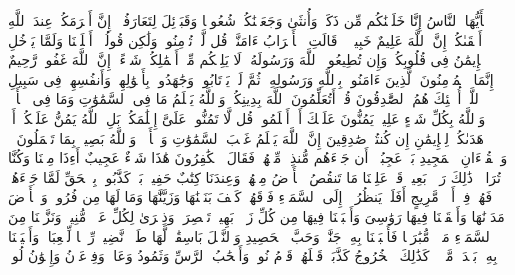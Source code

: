 \stopbuffer%
\startbuffer[\q:49:13]
یَٰۤأَیُّهَا ٱلنَّاسُ إِنَّا خَلَقۡنَٰكُم مِّن ذَكَرࣲ وَأُنثَىٰ وَجَعَلۡنَٰكُمۡ شُعُوبࣰا وَقَبَاۤئِلَ لِتَعَارَفُوۤا۟ۚ إِنَّ أَكۡرَمَكُمۡ عِندَ ٱللَّهِ أَتۡقَىٰكُمۡۚ إِنَّ ٱللَّهَ عَلِیمٌ خَبِیرࣱ%
\stopbuffer%
\startbuffer[\q:49:14]
۞ قَالَتِ ٱلۡأَعۡرَابُ ءَامَنَّاۖ قُل لَّمۡ تُؤۡمِنُوا۟ وَلَٰكِن قُولُوۤا۟ أَسۡلَمۡنَا وَلَمَّا یَدۡخُلِ ٱلۡإِیمَٰنُ فِی قُلُوبِكُمۡۖ وَإِن تُطِیعُوا۟ ٱللَّهَ وَرَسُولَهُۥ لَا یَلِتۡكُم مِّنۡ أَعۡمَٰلِكُمۡ شَیۡءًاۚ إِنَّ ٱللَّهَ غَفُورࣱ رَّحِیمٌ%
\stopbuffer%
\startbuffer[\q:49:15]
إِنَّمَا ٱلۡمُؤۡمِنُونَ ٱلَّذِینَ ءَامَنُوا۟ بِٱللَّهِ وَرَسُولِهِۦ ثُمَّ لَمۡ یَرۡتَابُوا۟ وَجَٰهَدُوا۟ بِأَمۡوَٰلِهِمۡ وَأَنفُسِهِمۡ فِی سَبِیلِ ٱللَّهِۚ أُو۟لَٰۤئِكَ هُمُ ٱلصَّٰدِقُونَ%
\stopbuffer%
\startbuffer[\q:49:16]
قُلۡ أَتُعَلِّمُونَ ٱللَّهَ بِدِینِكُمۡ وَٱللَّهُ یَعۡلَمُ مَا فِی ٱلسَّمَٰوَٰتِ وَمَا فِی ٱلۡأَرۡضِۚ وَٱللَّهُ بِكُلِّ شَیۡءٍ عَلِیمࣱ%
\stopbuffer%
\startbuffer[\q:49:17]
یَمُنُّونَ عَلَیۡكَ أَنۡ أَسۡلَمُوا۟ۖ قُل لَّا تَمُنُّوا۟ عَلَیَّ إِسۡلَٰمَكُمۖ بَلِ ٱللَّهُ یَمُنُّ عَلَیۡكُمۡ أَنۡ هَدَىٰكُمۡ لِلۡإِیمَٰنِ إِن كُنتُمۡ صَٰدِقِینَ%
\stopbuffer%
\startbuffer[\q:49:18]
إِنَّ ٱللَّهَ یَعۡلَمُ غَیۡبَ ٱلسَّمَٰوَٰتِ وَٱلۡأَرۡضِۚ وَٱللَّهُ بَصِیرُۢ بِمَا تَعۡمَلُونَ%
\stopbuffer%
\startbuffer[\q:50:1]
قۤۚ وَٱلۡقُرۡءَانِ ٱلۡمَجِیدِ%
\stopbuffer%
\startbuffer[\q:50:2]
بَلۡ عَجِبُوۤا۟ أَن جَاۤءَهُم مُّنذِرࣱ مِّنۡهُمۡ فَقَالَ ٱلۡكَٰفِرُونَ هَٰذَا شَیۡءٌ عَجِیبٌ%
\stopbuffer%
\startbuffer[\q:50:3]
أَءِذَا مِتۡنَا وَكُنَّا تُرَابࣰاۖ ذَٰلِكَ رَجۡعُۢ بَعِیدࣱ%
\stopbuffer%
\startbuffer[\q:50:4]
قَدۡ عَلِمۡنَا مَا تَنقُصُ ٱلۡأَرۡضُ مِنۡهُمۡۖ وَعِندَنَا كِتَٰبٌ حَفِیظُۢ%
\stopbuffer%
\startbuffer[\q:50:5]
بَلۡ كَذَّبُوا۟ بِٱلۡحَقِّ لَمَّا جَاۤءَهُمۡ فَهُمۡ فِیۤ أَمۡرࣲ مَّرِیجٍ%
\stopbuffer%
\startbuffer[\q:50:6]
أَفَلَمۡ یَنظُرُوۤا۟ إِلَى ٱلسَّمَاۤءِ فَوۡقَهُمۡ كَیۡفَ بَنَیۡنَٰهَا وَزَیَّنَّٰهَا وَمَا لَهَا مِن فُرُوجࣲ%
\stopbuffer%
\startbuffer[\q:50:7]
وَٱلۡأَرۡضَ مَدَدۡنَٰهَا وَأَلۡقَیۡنَا فِیهَا رَوَٰسِیَ وَأَنۢبَتۡنَا فِیهَا مِن كُلِّ زَوۡجِۭ بَهِیجࣲ%
\stopbuffer%
\startbuffer[\q:50:8]
تَبۡصِرَةࣰ وَذِكۡرَىٰ لِكُلِّ عَبۡدࣲ مُّنِیبࣲ%
\stopbuffer%
\startbuffer[\q:50:9]
وَنَزَّلۡنَا مِنَ ٱلسَّمَاۤءِ مَاۤءࣰ مُّبَٰرَكࣰا فَأَنۢبَتۡنَا بِهِۦ جَنَّٰتࣲ وَحَبَّ ٱلۡحَصِیدِ%
\stopbuffer%
\startbuffer[\q:50:10]
وَٱلنَّخۡلَ بَاسِقَٰتࣲ لَّهَا طَلۡعࣱ نَّضِیدࣱ%
\stopbuffer%
\startbuffer[\q:50:11]
رِّزۡقࣰا لِّلۡعِبَادِۖ وَأَحۡیَیۡنَا بِهِۦ بَلۡدَةࣰ مَّیۡتࣰاۚ كَذَٰلِكَ ٱلۡخُرُوجُ%
\stopbuffer%
\startbuffer[\q:50:12]
كَذَّبَتۡ قَبۡلَهُمۡ قَوۡمُ نُوحࣲ وَأَصۡحَٰبُ ٱلرَّسِّ وَثَمُودُ%
\stopbuffer%
\startbuffer[\q:50:13]
وَعَادࣱ وَفِرۡعَوۡنُ وَإِخۡوَٰنُ لُوطࣲ%

